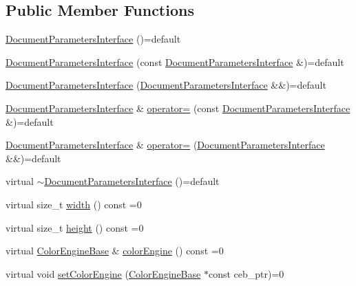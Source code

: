 \subsection*{Public Member Functions}
\begin{DoxyCompactItemize}
\item 
\hyperlink{classGraphicalEditorCore_1_1DocumentParametersInterface_aea8d5f5d01c0046d0bc2adad22487b23}{Document\+Parameters\+Interface} ()=default
\item 
\hyperlink{classGraphicalEditorCore_1_1DocumentParametersInterface_a95795d8f0e1cb69c18b468739325a0bb}{Document\+Parameters\+Interface} (const \hyperlink{classGraphicalEditorCore_1_1DocumentParametersInterface}{Document\+Parameters\+Interface} \&)=default
\item 
\hyperlink{classGraphicalEditorCore_1_1DocumentParametersInterface_a72b15c164f9f457c29d314ba6762fd84}{Document\+Parameters\+Interface} (\hyperlink{classGraphicalEditorCore_1_1DocumentParametersInterface}{Document\+Parameters\+Interface} \&\&)=default
\item 
\hyperlink{classGraphicalEditorCore_1_1DocumentParametersInterface}{Document\+Parameters\+Interface} \& \hyperlink{classGraphicalEditorCore_1_1DocumentParametersInterface_aa5a6d4d881b9812f8406f01ec1e20e50}{operator=} (const \hyperlink{classGraphicalEditorCore_1_1DocumentParametersInterface}{Document\+Parameters\+Interface} \&)=default
\item 
\hyperlink{classGraphicalEditorCore_1_1DocumentParametersInterface}{Document\+Parameters\+Interface} \& \hyperlink{classGraphicalEditorCore_1_1DocumentParametersInterface_a43e956fc79f52aff91ea8e2d0b952e5c}{operator=} (\hyperlink{classGraphicalEditorCore_1_1DocumentParametersInterface}{Document\+Parameters\+Interface} \&\&)=default
\item 
virtual \hyperlink{classGraphicalEditorCore_1_1DocumentParametersInterface_a17f379e6cde775c74283e90d046372e4}{$\sim$\+Document\+Parameters\+Interface} ()=default
\item 
virtual size\+\_\+t \hyperlink{classGraphicalEditorCore_1_1DocumentParametersInterface_a8e96d1aa50d0b2bd3ef21fafaeaa4261}{width} () const =0
\item 
virtual size\+\_\+t \hyperlink{classGraphicalEditorCore_1_1DocumentParametersInterface_a1a3f45e27f2c9b11d04b2fe562323bb2}{height} () const =0
\item 
virtual \hyperlink{classGraphicalEditorCore_1_1ColorEngineBase}{Color\+Engine\+Base} \& \hyperlink{classGraphicalEditorCore_1_1DocumentParametersInterface_aa686512ed2fc7bc504c1ee97ac8e4ad6}{color\+Engine} () const =0
\item 
virtual void \hyperlink{classGraphicalEditorCore_1_1DocumentParametersInterface_aeba626dbd31400b97a067bef47acc29d}{set\+Color\+Engine} (\hyperlink{classGraphicalEditorCore_1_1ColorEngineBase}{Color\+Engine\+Base} $\ast$const ceb\+\_\+ptr)=0
\end{DoxyCompactItemize}


